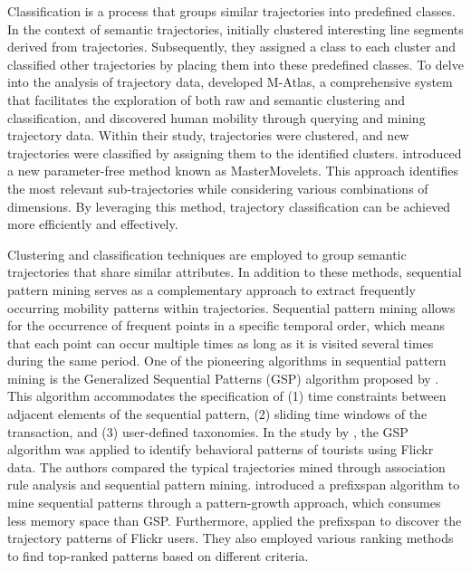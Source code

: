 \documentclass{article}
\theoremstyle{remark}
\begin{document}
Classification is a process that groups similar trajectories into predefined classes. In the context of semantic trajectories, \cite{lee_trajectory_2007} initially clustered interesting line segments derived from trajectories. Subsequently, they assigned a class to each cluster and classified other trajectories by placing them into these predefined classes. To delve into the analysis of trajectory data, \cite{giannotti_unveiling_2011} developed M-Atlas, a comprehensive system that facilitates the exploration of both raw and semantic clustering and classification, and discovered human mobility through querying and mining trajectory data. Within their study, trajectories were clustered, and new trajectories were classified by assigning them to the identified clusters. \cite{ferrero_mastermovelets_2020} introduced a new parameter-free method known as MasterMovelets. This approach identifies the most relevant sub-trajectories while considering various combinations of dimensions. By leveraging this method, trajectory classification can be achieved more efficiently and effectively. 

Clustering and classification techniques are employed to group semantic trajectories that share similar attributes. In addition to these methods, sequential pattern mining serves as a complementary approach to extract frequently occurring mobility patterns within trajectories. Sequential pattern mining allows for the occurrence of frequent points in a specific temporal order, which means that each point can occur multiple times as long as it is visited several times during the same period. One of the pioneering algorithms in sequential pattern mining is the Generalized Sequential Patterns (GSP) algorithm proposed by \cite{srikant_mining_1996}. This algorithm accommodates the specification of (1) time constraints between adjacent elements of the sequential pattern, (2) sliding time windows of the transaction, and (3) user-defined taxonomies. In the study by \cite{hopken_flickr_2020}, the GSP algorithm was applied to identify behavioral patterns of tourists using Flickr data. The authors compared the typical trajectories mined through association rule analysis and sequential pattern mining. \cite{pei_mining_2004} introduced a \acrfull{prefixspan} algorithm to mine sequential patterns through a pattern-growth approach, which consumes less memory space than GSP. Furthermore, \cite{yin_diversified_2011} applied the \acrshort{prefixspan} to discover the trajectory patterns of Flickr users. They also employed various ranking methods to find top-ranked patterns based on different criteria.
\end{document}
